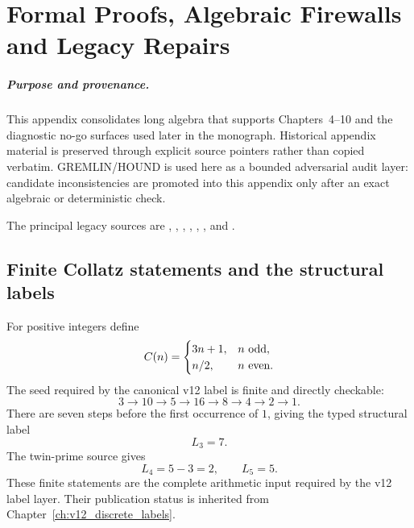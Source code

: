 
\chapter{Formal Proofs, Algebraic Firewalls and Legacy Repairs}
\label{app:v12_formal_proofs}

\paragraph{Purpose and provenance.}
This appendix consolidates long algebra that supports Chapters~4--10 and the
diagnostic no-go surfaces used later in the monograph.  Historical appendix
material is preserved through explicit source pointers rather than copied
verbatim.  GREMLIN/HOUND is used here as a bounded adversarial audit layer:
candidate inconsistencies are promoted into this appendix only after an exact
algebraic or deterministic check.

The principal legacy sources are
,
,
,
,
,
, and
.

\section{Finite Collatz statements and the structural labels}

For positive integers define
\[
C(n)=
\begin{cases}
3n+1,&n\ \hbox{odd},\\
n/2,&n\ \hbox{even}.
\end{cases}
\]
The seed required by the canonical v12 label is finite and directly checkable:
\[
3\to10\to5\to16\to8\to4\to2\to1.
\]
There are seven steps before the first occurrence of \(1\), giving the typed
structural label
\[
\boxed{L_3=7.}
\]
The twin-prime source gives
\[
\boxed{L_4=5-3=2,\qquad L_5=5.}
\]
These finite statements are the complete arithmetic input required by the
v12 label layer.  Their publication status is inherited from
Chapter~\ref{ch:v12_discrete_labels}.

